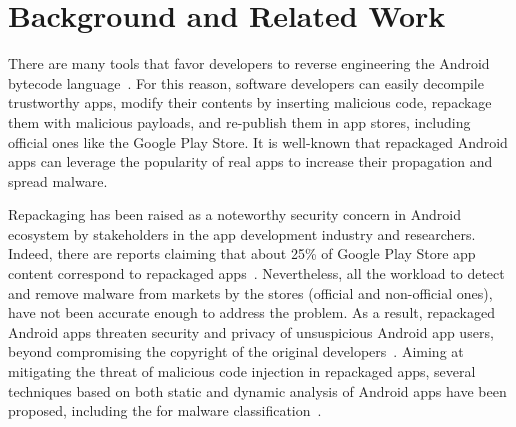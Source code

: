 \section{Background and Related Work}\label{sec:background}


There are many tools that favor developers to reverse engineering the Android bytecode language~\cite{DBLP:conf/issta/WangGMC15}.
For this reason, software developers can easily decompile trustworthy apps, modify their contents by inserting malicious code,
repackage them with malicious payloads, and re-publish them in app stores, including official ones like the Google Play Store.
It is well-known that repackaged Android apps can leverage the popularity of real apps to increase their propagation and spread malware. 

Repackaging has been raised as a noteworthy security concern in Android ecosystem by stakeholders in the app development industry and researchers. Indeed, there are reports claiming that about 25\% of Google Play Store app content correspond to repackaged apps~\cite{DBLP:conf/sigmetrics/ViennotGN14}. Nevertheless, all the workload to detect and remove malware from markets by the stores (official and non-official ones), have not been accurate enough to address the problem. As a result, repackaged Android apps threaten security and privacy of unsuspicious Android app users, beyond compromising the copyright of the original developers~\cite{DBLP:journals/access/KimLCP19}. Aiming at
mitigating the threat of malicious code injection in repackaged apps,
several techniques based on both static and dynamic analysis of Android apps have been proposed,
including the \mas for malware classification~\cite{DBLP:conf/icse/JamrozikSZ16,DBLP:conf/wcre/BaoLL18}. 





